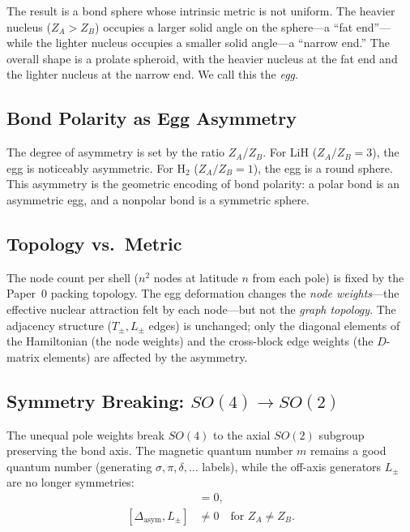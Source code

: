 \documentclass[aps,pra,twocolumn,superscriptaddress,longbibliography]{revtex4-2}
\theoremstyle{remark}
\theoremstyle{plain}
\begin{document}
The result is a bond sphere whose intrinsic metric is not uniform.
The heavier nucleus ($Z_A > Z_B$) occupies a larger solid angle on the
sphere---a ``fat end''---while the lighter nucleus occupies a smaller
solid angle---a ``narrow end.''  The overall shape is a prolate
spheroid, with the heavier nucleus at the fat end and the lighter
nucleus at the narrow end.  We call this the \emph{egg}.

\subsection{Bond Polarity as Egg Asymmetry}

The degree of asymmetry is set by the ratio $Z_A/Z_B$.  For LiH
($Z_A/Z_B = 3$), the egg is noticeably asymmetric.  For H$_2$
($Z_A/Z_B = 1$), the egg is a round sphere.  This asymmetry is
the geometric encoding of bond polarity: a polar bond is an
asymmetric egg, and a nonpolar bond is a symmetric sphere.

\subsection{Topology vs.\ Metric}

The node count per shell ($n^2$ nodes at latitude $n$ from each pole)
is fixed by the Paper~0 packing topology.  The egg deformation changes
the \emph{node weights}---the effective nuclear attraction felt by each
node---but not the \emph{graph topology}.  The adjacency structure
($T_\pm, L_\pm$ edges) is unchanged; only the diagonal elements of the
Hamiltonian (the node weights) and the cross-block edge weights (the
$D$-matrix elements) are affected by the asymmetry.

\subsection{Symmetry Breaking: $SO(4) \to SO(2)$}

The unequal pole weights break $SO(4)$ to the axial $SO(2)$ subgroup
preserving the bond axis.  The magnetic quantum number $m$ remains a
good quantum number (generating $\sigma, \pi, \delta, \ldots$ labels),
while the off-axis generators $L_\pm$ are no longer symmetries:
\begin{align}
[\Delta_{\text{asym}}, L_z] &= 0, \label{eq:Lz_comm} \\
[\Delta_{\text{asym}}, L_\pm] &\neq 0 \quad\text{for } Z_A \neq Z_B.
\label{eq:Lpm_comm}
\end{align}
\end{document}
